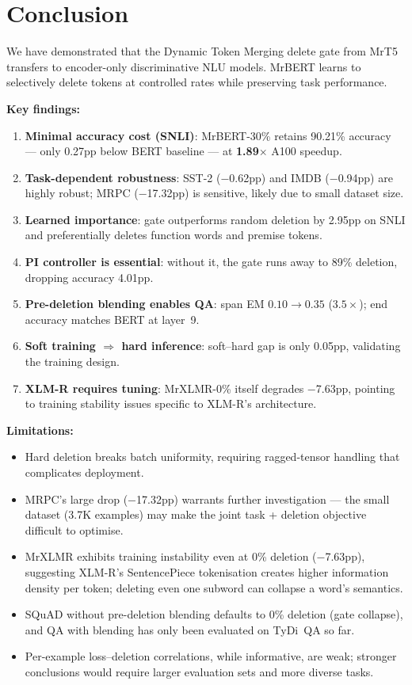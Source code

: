 \documentclass[11pt,a4paper]{article}
\begin{document}
\section{Conclusion}
\label{sec:conclusion}

We have demonstrated that the Dynamic Token Merging delete gate from MrT5 transfers to encoder-only discriminative NLU models. MrBERT learns to selectively delete tokens at controlled rates while preserving task performance. 

\noindent\textbf{Key findings:}

\begin{enumerate}[nosep]
    \item \textbf{Minimal accuracy cost (SNLI)}: MrBERT-30\% retains 90.21\% accuracy --- only 0.27pp below BERT baseline --- at \textbf{1.89$\times$} A100 speedup.
    \item \textbf{Task-dependent robustness}: SST-2 ($-$0.62pp) and IMDB ($-$0.94pp) are highly robust; MRPC ($-$17.32pp) is sensitive, likely due to small dataset size.
    \item \textbf{Learned importance}: gate outperforms random deletion by 2.95pp on SNLI and preferentially deletes function words and premise tokens.
    \item \textbf{PI controller is essential}: without it, the gate runs away to 89\% deletion, dropping accuracy 4.01pp.
    \item \textbf{Pre-deletion blending enables QA}: span EM $0.10\to0.35$ ($3.5\times$); end accuracy matches BERT at layer~9.
    \item \textbf{Soft training $\Rightarrow$ hard inference}: soft--hard gap is only 0.05pp, validating the training design.
    \item \textbf{XLM-R requires tuning}: MrXLMR-0\% itself degrades $-$7.63pp, pointing to training stability issues specific to XLM-R's architecture.
\end{enumerate}

\noindent \textbf{Limitations:}
\begin{itemize}[nosep]
    \item Hard deletion breaks batch uniformity, requiring ragged-tensor handling that complicates deployment.
    \item MRPC's large drop ($-$17.32pp) warrants further investigation --- the small dataset (3.7K examples) may make the joint task + deletion objective difficult to optimise.
    \item MrXLMR exhibits training instability even at 0\% deletion ($-$7.63pp), suggesting XLM-R's SentencePiece tokenisation creates higher information density per token; deleting even one subword can collapse a word's semantics.
    \item SQuAD without pre-deletion blending defaults to 0\% deletion (gate collapse), and QA with blending has only been evaluated on TyDi~QA so far.
    \item Per-example loss--deletion correlations, while informative, are weak; stronger conclusions would require larger evaluation sets and more diverse tasks.
\end{itemize}
\end{document}
